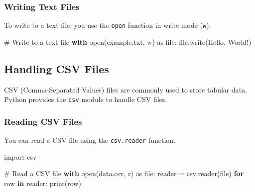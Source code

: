 \documentclass[
  letterpaper,
  DIV=11,
  numbers=noendperiod]{scrreprt}
\newenvironment{Shaded}{\begin{snugshade}}{\end{snugshade}}
\newcommand{\BuiltInTok}[1]{\textcolor[rgb]{0.00,0.23,0.31}{#1}}
\newcommand{\CommentTok}[1]{\textcolor[rgb]{0.37,0.37,0.37}{#1}}
\newcommand{\ControlFlowTok}[1]{\textcolor[rgb]{0.00,0.23,0.31}{\textbf{#1}}}
\newcommand{\ImportTok}[1]{\textcolor[rgb]{0.00,0.46,0.62}{#1}}
\newcommand{\KeywordTok}[1]{\textcolor[rgb]{0.00,0.23,0.31}{\textbf{#1}}}
\newcommand{\NormalTok}[1]{\textcolor[rgb]{0.00,0.23,0.31}{#1}}
\newcommand{\OperatorTok}[1]{\textcolor[rgb]{0.37,0.37,0.37}{#1}}
\newcommand{\StringTok}[1]{\textcolor[rgb]{0.13,0.47,0.30}{#1}}
\begin{document}
\subsubsection{Writing Text Files}\label{writing-text-files}

To write to a text file, you use the \texttt{open} function in write
mode (\texttt{\textquotesingle{}w\textquotesingle{}}).

\begin{Shaded}
\begin{Highlighting}[]
\CommentTok{\# Write to a text file}
\ControlFlowTok{with} \BuiltInTok{open}\NormalTok{(}\StringTok{\textquotesingle{}example.txt\textquotesingle{}}\NormalTok{, }\StringTok{\textquotesingle{}w\textquotesingle{}}\NormalTok{) }\ImportTok{as} \BuiltInTok{file}\NormalTok{:}
    \BuiltInTok{file}\NormalTok{.write(}\StringTok{\textquotesingle{}Hello, World!\textquotesingle{}}\NormalTok{)}
\end{Highlighting}
\end{Shaded}

\subsection{Handling CSV Files}\label{handling-csv-files}

CSV (Comma-Separated Values) files are commonly used to store tabular
data. Python provides the \texttt{csv} module to handle CSV files.

\subsubsection{Reading CSV Files}\label{reading-csv-files}

You can read a CSV file using the \texttt{csv.reader} function.

\begin{Shaded}
\begin{Highlighting}[]
\ImportTok{import}\NormalTok{ csv}

\CommentTok{\# Read a CSV file}
\ControlFlowTok{with} \BuiltInTok{open}\NormalTok{(}\StringTok{\textquotesingle{}data.csv\textquotesingle{}}\NormalTok{, }\StringTok{\textquotesingle{}r\textquotesingle{}}\NormalTok{) }\ImportTok{as} \BuiltInTok{file}\NormalTok{:}
\NormalTok{    reader }\OperatorTok{=}\NormalTok{ csv.reader(}\BuiltInTok{file}\NormalTok{)}
    \ControlFlowTok{for}\NormalTok{ row }\KeywordTok{in}\NormalTok{ reader:}
        \BuiltInTok{print}\NormalTok{(row)}
\end{Highlighting}
\end{Shaded}
\end{document}
